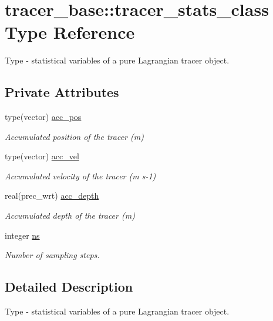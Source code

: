 \hypertarget{structtracer__base_1_1tracer__stats__class}{}\section{tracer\+\_\+base\+:\+:tracer\+\_\+stats\+\_\+class Type Reference}
\label{structtracer__base_1_1tracer__stats__class}


Type -\/ statistical variables of a pure Lagrangian tracer object.  


\subsection*{Private Attributes}
\begin{DoxyCompactItemize}
\item 
type(vector) \hyperlink{structtracer__base_1_1tracer__stats__class_ae01f6d724c6a81e28d959571187e5949}{acc\+\_\+pos}
\begin{DoxyCompactList}\small\item\em Accumulated position of the tracer (m) \end{DoxyCompactList}\item 
type(vector) \hyperlink{structtracer__base_1_1tracer__stats__class_af5c29fc910469ddabe6e549a3743c310}{acc\+\_\+vel}
\begin{DoxyCompactList}\small\item\em Accumulated velocity of the tracer (m s-\/1) \end{DoxyCompactList}\item 
real(prec\+\_\+wrt) \hyperlink{structtracer__base_1_1tracer__stats__class_a33ecd4e2ae6ac454806fc383dbc0855a}{acc\+\_\+depth}
\begin{DoxyCompactList}\small\item\em Accumulated depth of the tracer (m) \end{DoxyCompactList}\item 
integer \hyperlink{structtracer__base_1_1tracer__stats__class_a77e72ef1bc36c7b337f2d1b199010e81}{ns}
\begin{DoxyCompactList}\small\item\em Number of sampling steps. \end{DoxyCompactList}\end{DoxyCompactItemize}


\subsection{Detailed Description}
Type -\/ statistical variables of a pure Lagrangian tracer object. 


